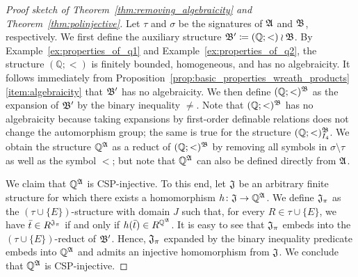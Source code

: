 \begin{proof}[Proof sketch of Theorem~\ref{thm:removing_algebraicity} and Theorem~\ref{thm:polinjective}]  
Let $\tau$ and $\sigma$ be the signatures of $\mathfrak{A}$ and $\mathfrak{B}$, respectively. 
%
We first define the auxiliary structure $\mathfrak{B}'\mathrel{\mathop:}\mathrel{\mkern-1.2mu}=  (\mathbb{Q};<) \wr \mathfrak{B}$. 
%
By Example~\ref{ex:properties_of_q1} and Example~\ref{ex:properties_of_q2}, the structure $(\mathbb{Q};<)$ is finitely bounded, homogeneous, and has no algebraicity.
%
It follows immediately from Proposition~\ref{prop:basic_properties_wreath_products}\eqref{item:algebraicity}  that $\mathfrak{B}'$ has no algebraicity.
% 
We then define $(\mathbb{Q};<)^{\mathfrak{B}}$ as the expansion of $\mathfrak{B}'$ by the binary inequality $\neq$.
%
Note that $(\mathbb{Q};<)^{\mathfrak{B}}$ has no algebraicity because taking expansions by first-order definable relations does not change the automorphism group; the same is true for the structure $(\mathbb{Q};<)^{\mathfrak{B}}_{I_4}$.
%
We obtain the structure $\mathbb{Q}^{\mathfrak{A}}$ as a reduct of $(\mathbb{Q};<)^{\mathfrak{B}}$ by removing all symbols in $\sigma\setminus \tau$ as well as the symbol $<$; but note that $\mathbb{Q}^{\mathfrak{A}}$ can also be defined directly from $\mathfrak{A}$. 
 
We claim that $\mathbb{Q}^{\mathfrak{A}}$ is CSP-injective. 
%
To this end, let $\mathfrak{J}$ be an arbitrary finite structure for which there exists a homomorphism $h\colon \mathfrak{J} \rightarrow \mathbb{Q}^{\mathfrak{A}}$.
%
We define $\mathfrak{J}_{\pi}$ as the $(\tau \cup \{E\})$-structure with domain $J$ such that, for every $R\in \tau\cup \{E\}$, we have $\bar{t}\in R^{\mathfrak{J}_{\pi}}$ if and only if $h(\bar{t})\in R^{\mathbb{Q}^{\mathfrak{A}}}$.
% 
It is easy to see that $\mathfrak{J}_{\pi}$ embeds into the $(\tau \cup \{E\})$-reduct of $\mathfrak{B}'$.
%
Hence, $\mathfrak{J}_{\pi}$ expanded by the binary inequality predicate embeds into $\mathbb{Q}^{\mathfrak{A}}$ and admits an injective homomorphism from $\mathfrak{J}$.
%
We conclude that $\mathbb{Q}^{\mathfrak{A}}$ is CSP-injective.


\end{proof}
